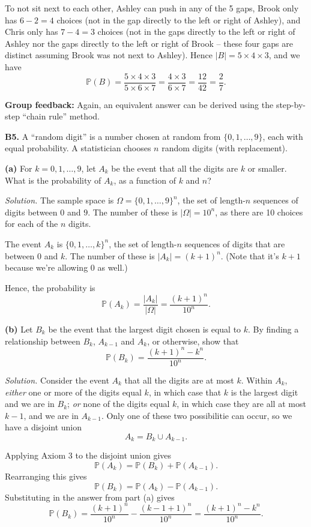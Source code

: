 \documentclass[
  a4paper,
]{book}
\theoremstyle{definition}
\theoremstyle{definition}
\theoremstyle{definition}
\theoremstyle{definition}
\theoremstyle{remark}
\begin{document}
\begin{myanswers}
To not sit next to each other, Ashley can push in any of the 5 gaps, Brook only has \(6 - 2 = 4\) choices (not in the gap directly to the left or right of Ashley), and Chris only has \(7 - 4 = 3\) choices (not in the gaps directly to the left or right of Ashley nor the gaps directly to the left or right of Brook -- these four gaps are distinct assuming Brook was not next to Ashley). Hence \(|B| = 5 \times 4 \times 3\), and we have
\[ \mathbb P(B) = \frac{5 \times 4 \times 3}{5 \times 6 \times 7} = \frac{4 \times 3}{6 \times 7} = \frac{12}{42} = \frac{2}{7}.  \]

\textbf{Group feedback:} Again, an equivalent answer can be derived using the step-by-step ``chain rule'' method.

\end{myanswers}

\textbf{B5.} A ``random digit'' is a number chosen at random from \(\{0, 1, \dots, 9\}\), each with equal probability. A statistician chooses \(n\) random digits (with replacement).

\textbf{(a)} For \(k = 0, 1, \dots, 9\), let \(A_k\) be the event that all the digits are \(k\) or smaller. What is the probability of \(A_k\), as a function of \(k\) and \(n\)?

\begin{myanswers}
\emph{Solution.}
The sample space is \(\Omega = \{0,1,\dots,9\}^n\), the set of length-\(n\) sequences of digits between \(0\) and \(9\). The number of these is \(|\Omega| = 10^n\), as there are 10 choices for each of the \(n\) digits.

The event \(A_k\) is \(\{0,1,\dots,k\}^n\), the set of length-\(n\) sequences of digits that are between \(0\) and \(k\). The number of these is \(|A_k| = (k+1)^n\). (Note that it's \(k+1\) because we're allowing 0 as well.)

Hence, the probability is
\[ \mathbb P(A_k) = \frac{|A_k|}{|\Omega|} = \frac{(k+1)^n}{10^n} . \]

\end{myanswers}

\textbf{(b)} Let \(B_k\) be the event that the largest digit chosen is equal to \(k\). By finding a relationship between \(B_k\), \(A_{k-1}\) and \(A_k\), or otherwise, show that
\[ \mathbb P(B_k) = \frac{(k+1)^n - k^n}{10^n} . \]

\begin{myanswers}
\emph{Solution.}
Consider the event \(A_k\) that all the digits are at most \(k\). Within \(A_k\), \emph{either} one or more of the digits equal \(k\), in which case that \(k\) is the largest digit and we are in \(B_k\); \emph{or} none of the digits equal \(k\), in which case they are all at most \(k-1\), and we are in \(A_{k-1}\). Only one of these two possibilitie can occur, so we have a disjoint union
\[ A_k = B_k \cup A_{k-1} . \]

Applying Axiom 3 to the disjoint union gives
\[ \mathbb P(A_k) = \mathbb P(B_k) + \mathbb P(A_{k-1}) . \]
Rearranging this gives
\[ \mathbb P(B_k) = \mathbb P(A_k) - \mathbb P(A_{k-1}) . \]
Substituting in the answer from part (a) gives
\[\mathbb P(B_k) = \frac{(k+1)^n}{10^n} - \frac{(k-1+1)^n}{10^n} = \frac{(k+1)^n - k^n}{10^n} . \]

\end{myanswers}
\end{document}

